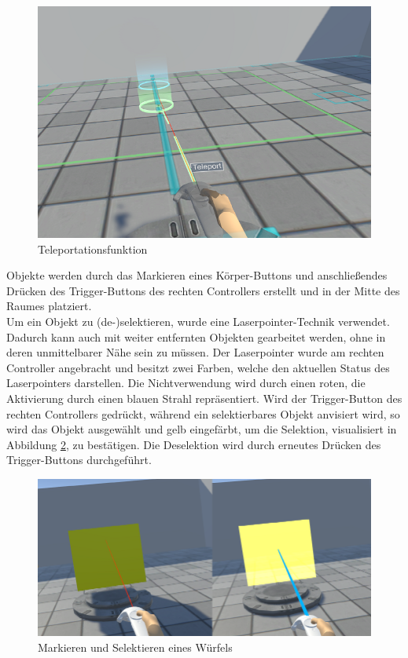 \begin{figure}[h]
\captionsetup{width=.7\linewidth}
\includegraphics[scale=0.5]{Bilder/Hauptteil/Bearbeitet/Teleport}
\centering
\caption{Teleportationsfunktion}
\label{fig:teleportation}
\end{figure}

\noindent Objekte werden durch das Markieren eines Körper-Buttons und anschließendes Drücken des Trigger-Buttons des rechten Controllers erstellt und in der Mitte des Raumes platziert.\\
Um ein Objekt zu (de-)selektieren, wurde eine Laserpointer-Technik verwendet. Dadurch kann auch mit weiter entfernten Objekten gearbeitet werden, ohne in deren unmittelbarer Nähe sein zu müssen. Der Laserpointer wurde am rechten Controller angebracht und besitzt zwei Farben, welche den aktuellen Status des Laserpointers darstellen. Die Nichtverwendung wird durch einen roten, die Aktivierung durch einen blauen Strahl repräsentiert. Wird der Trigger-Button des rechten Controllers gedrückt, während ein selektierbares Objekt anvisiert wird, so wird das Objekt ausgewählt und gelb eingefärbt, um die Selektion, visualisiert in Abbildung \ref{fig:selektion}, zu bestätigen. Die Deselektion wird durch erneutes Drücken des Trigger-Buttons durchgeführt.

\begin{figure}[h]
\captionsetup{width=.7\linewidth}
\includegraphics[scale=0.5]{Bilder/Hauptteil/Bearbeitet/SelektionMerge}
\centering
\caption{Markieren und Selektieren eines Würfels}
\label{fig:selektion}
\end{figure}

